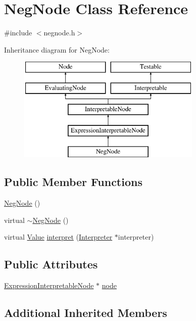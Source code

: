 \hypertarget{classNegNode}{}\section{Neg\+Node Class Reference}
\label{classNegNode}


{\ttfamily \#include $<$negnode.\+h$>$}

Inheritance diagram for Neg\+Node\+:\begin{figure}[H]
\begin{center}
\leavevmode
\includegraphics[height=5.000000cm]{classNegNode}
\end{center}
\end{figure}
\subsection*{Public Member Functions}
\begin{DoxyCompactItemize}
\item 
\hyperlink{classNegNode_a543d2b5abde85cbcaca1e8927ec55c9e}{Neg\+Node} ()
\item 
virtual \hyperlink{classNegNode_aba880abbb0e47060985c5ec3e3e0c3fc}{$\sim$\+Neg\+Node} ()
\item 
virtual \hyperlink{classValue}{Value} \hyperlink{classNegNode_a35ff48d55ab355e27f33dcc21483e4c7}{interpret} (\hyperlink{classInterpreter}{Interpreter} $\ast$interpreter)
\end{DoxyCompactItemize}
\subsection*{Public Attributes}
\begin{DoxyCompactItemize}
\item 
\hyperlink{classExpressionInterpretableNode}{Expression\+Interpretable\+Node} $\ast$ \hyperlink{classNegNode_ac1c92a11fc98afbb953cd391d84074c2}{node}
\end{DoxyCompactItemize}
\subsection*{Additional Inherited Members}


